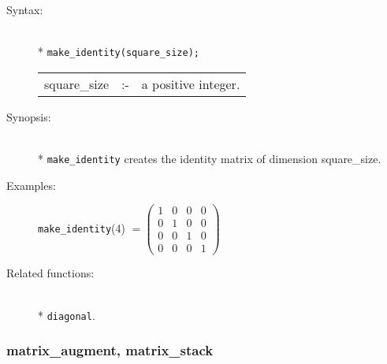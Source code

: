 \begin{description}
\item[Syntax:]\mbox{}\\*
\texttt{make\_identity(square\_size);}\\[2mm]
\begin{tabular}{l l l}
square\_size &:-& a positive integer.
\end{tabular}

\item[Synopsis:]\mbox{}\\*
\texttt{make\_identity} creates the identity matrix of
                dimension square\_size.

\item[Examples:]
\begin{flushleft}
\texttt{make\_identity}(4) \(=
        \begin{pmatrix} 1 & 0 & 0 & 0 \\ 0 & 1 & 0 & 0 \\
                        0 & 0 & 1 & 0 \\ 0 & 0 & 0 & 1
 \end{pmatrix}\)
\end{flushleft}

\item[Related functions:]\mbox{}\\*
\texttt{diagonal}.
\end{description}


\subsubsection{matrix\_augment, matrix\_stack}
\label{linalg:matrix_augment}
\hypertarget{operator:MATRIX_AUGMENT}{}

